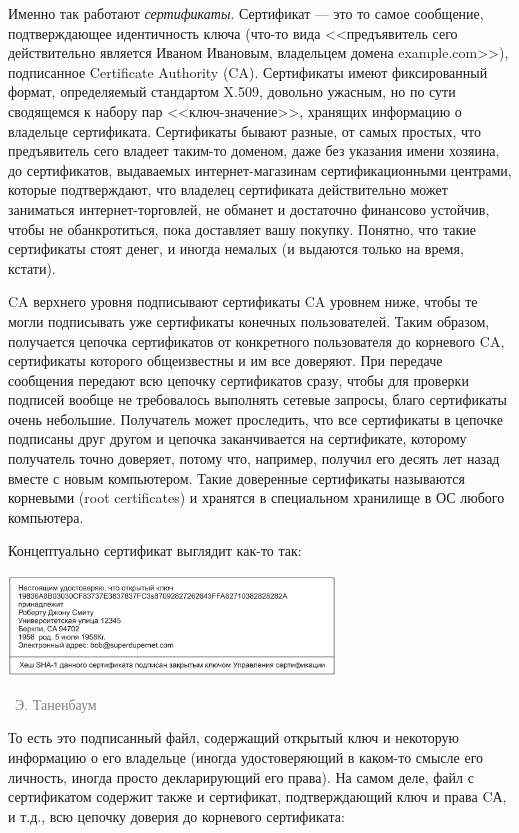 \documentclass[a5paper]{article}
\newcommand{\attribution}[1] {
\vspace{-5mm}\begin{flushright}\begin{scriptsize}\textcolor{gray}{\textcopyright\, #1}\end{scriptsize}\end{flushright}
}
\begin{document}
Именно так работают \textit{сертификаты}. Сертификат --- это то самое сообщение, подтверждающее идентичность ключа (что-то вида <<предъявитель сего действительно является Иваном Ивановым, владельцем домена example.com>>), подписанное Certificate Authority (CA). Сертификаты имеют фиксированный формат, определяемый стандартом X.509, довольно ужасным, но по сути сводящемся к набору пар <<ключ-значение>>, хранящих информацию о владельце сертификата. Сертификаты бывают разные, от самых простых, что предъявитель сего владеет таким-то доменом, даже без указания имени хозяина, до сертификатов, выдаваемых интернет-магазинам сертификационными центрами, которые подтверждают, что владелец сертификата действительно может заниматься интернет-торговлей, не обманет и достаточно финансово устойчив, чтобы не обанкротиться, пока доставляет вашу покупку.  Понятно, что такие сертификаты стоят денег, и иногда немалых (и выдаются только на время, кстати).

CA верхнего уровня подписывают сертификаты CA уровнем ниже, чтобы те могли подписывать уже сертификаты конечных пользователей. Таким образом, получается цепочка сертификатов от конкретного пользователя до корневого CA, сертификаты которого общеизвестны и им все доверяют. При передаче сообщения передают всю цепочку сертификатов сразу, чтобы для проверки подписей вообще не требовалось выполнять сетевые запросы, благо сертификаты очень небольшие. Получатель может проследить, что все сертификаты в цепочке подписаны друг другом и цепочка заканчивается на сертификате, которому получатель точно доверяет, потому что, например, получил его десять лет назад вместе с новым компьютером. Такие доверенные сертификаты называются корневыми (root certificates) и хранятся в специальном хранилище в ОС любого компьютера.

Концептуально сертификат выглядит как-то так:

\begin{center}
    \includegraphics[width=0.65\textwidth]{certificate.png}
    \attribution{Э. Таненбаум}
\end{center}

То есть это подписанный файл, содержащий открытый ключ и некоторую информацию о его владельце (иногда удостоверяющий в каком-то смысле его личность, иногда просто декларирующий его права). На самом деле, файл с сертификатом содержит также и сертификат, подтверждающий ключ и права CА, и т.д., всю цепочку доверия до корневого сертификата:
\end{document}

